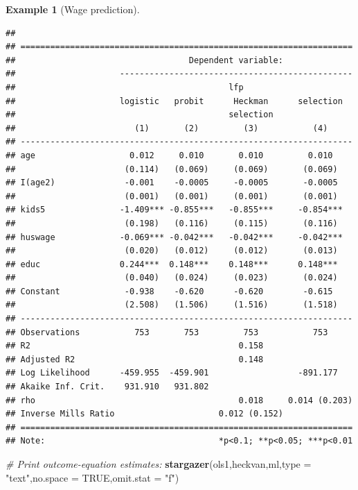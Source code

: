 \documentclass[
  12pt,
]{book}
\newenvironment{Shaded}{\begin{snugshade}}{\end{snugshade}}
\newcommand{\AttributeTok}[1]{\textcolor[rgb]{0.13,0.29,0.53}{#1}}
\newcommand{\CommentTok}[1]{\textcolor[rgb]{0.56,0.35,0.01}{\textit{#1}}}
\newcommand{\ConstantTok}[1]{\textcolor[rgb]{0.56,0.35,0.01}{#1}}
\newcommand{\FunctionTok}[1]{\textcolor[rgb]{0.13,0.29,0.53}{\textbf{#1}}}
\newcommand{\NormalTok}[1]{#1}
\newcommand{\StringTok}[1]{\textcolor[rgb]{0.31,0.60,0.02}{#1}}
\theoremstyle{definition}
\theoremstyle{definition}
\newtheorem{example}{Example}[chapter]
\theoremstyle{definition}
\theoremstyle{definition}
\theoremstyle{remark}
\begin{document}
\begin{example}[Wage prediction]
\begin{verbatim}
## 
## ===================================================================
##                                   Dependent variable:              
##                     -----------------------------------------------
##                                           lfp                      
##                     logistic   probit      Heckman      selection  
##                                           selection                
##                        (1)       (2)         (3)           (4)     
## -------------------------------------------------------------------
## age                   0.012     0.010       0.010         0.010    
##                      (0.114)   (0.069)     (0.069)       (0.069)   
## I(age2)              -0.001    -0.0005     -0.0005       -0.0005   
##                      (0.001)   (0.001)     (0.001)       (0.001)   
## kids5               -1.409*** -0.855***   -0.855***     -0.854***  
##                      (0.198)   (0.116)     (0.115)       (0.116)   
## huswage             -0.069*** -0.042***   -0.042***     -0.042***  
##                      (0.020)   (0.012)     (0.012)       (0.013)   
## educ                0.244***  0.148***    0.148***      0.148***   
##                      (0.040)   (0.024)     (0.023)       (0.024)   
## Constant             -0.938    -0.620      -0.620        -0.615    
##                      (2.508)   (1.506)     (1.516)       (1.518)   
## -------------------------------------------------------------------
## Observations           753       753         753           753     
## R2                                          0.158                  
## Adjusted R2                                 0.148                  
## Log Likelihood      -459.955  -459.901                  -891.177   
## Akaike Inf. Crit.    931.910   931.802                             
## rho                                         0.018     0.014 (0.203)
## Inverse Mills Ratio                     0.012 (0.152)              
## ===================================================================
## Note:                                   *p<0.1; **p<0.05; ***p<0.01
\end{verbatim}

\begin{Shaded}
\begin{Highlighting}[]
\CommentTok{\# Print outcome{-}equation estimates:}
\FunctionTok{stargazer}\NormalTok{(ols1,heckvan,ml,}\AttributeTok{type =} \StringTok{"text"}\NormalTok{,}\AttributeTok{no.space =} \ConstantTok{TRUE}\NormalTok{,}\AttributeTok{omit.stat =} \StringTok{"f"}\NormalTok{)}
\end{Highlighting}
\end{Shaded}


\end{example}
\end{document}
